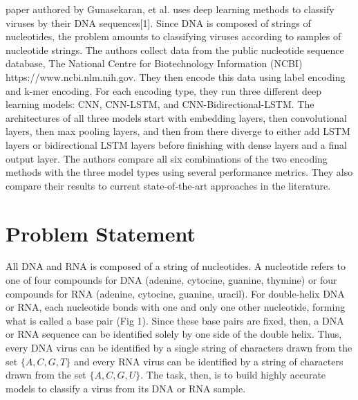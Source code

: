 \documentclass[journal]{IEEEtran}
\begin{document}
   paper authored by Gunasekaran, et al. uses deep learning methods
  to classify viruses by their DNA sequences[1]. Since DNA is composed of strings
  of nucleotides, the problem amounts to classifying viruses according to samples of nucleotide
  strings. The authors collect data from the public nucleotide sequence database,
  The National Centre for Biotechnology Information (NCBI) https://www.ncbi.nlm.nih.gov.
  They then encode this data using label encoding and k-mer encoding. For each encoding type,
  they run three different deep learning models: CNN, CNN-LSTM, and CNN-Bidirectional-LSTM.
  The architectures of all three models start with embedding layers, then convolutional layers,
  then max pooling layers, and then from there diverge to either add LSTM layers or
  bidirectional LSTM layers before finishing with dense layers and a final output layer.
  The authors compare all six combinations of the two encoding methods with the three model types
  using several performance metrics. They also compare their results to current state-of-the-art
  approaches in the literature.

\section{Problem Statement}
  All DNA and RNA is composed of a string of nucleotides. A nucleotide refers to one of
  four compounds for DNA (adenine, cytocine, guanine, thymine) or four compounds for RNA
  (adenine, cytocine, guanine, uracil). For double-helix DNA or RNA, each nucleotide
  bonds with one and only one other nucleotide, forming what is called a base pair (Fig 1). Since
  these base pairs are fixed, then, a DNA or RNA sequence can be identified solely by one
  side of the double helix. Thus, every DNA virus can be identified by a single string of
  characters drawn from the set $\{A, C, G, T\}$ and every RNA virus can be identified by a string
  of characters drawn from the set $\{A, C, G, U\}$. The task, then, is to build highly accurate
  models to classify a virus from its DNA or RNA sample.
\end{document}
